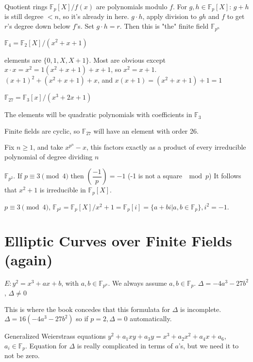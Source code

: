 \documentclass[10pt]{article}
\newcommand{\F}{\mathbb{F}}
\begin{document}
Quotient rings $\F_p[X]/f(x)$ are polynomials modulo $f$. For $g, h\in \F_p[X]$: $g + h$ is still degree $< n$, so it's already in here. $g\cdot h$, apply division to $gh$ and $f$ to get $r$'s degree down below $f$'s. Set $g\cdot h = r$. Then this is "the" finite field $\F_{p^n}$

\begin{exm*}
    $\F_4 = \F_2[X]/(x^2 + x + 1)$
\end{exm*}
elements are $\{0, 1, X, X+1\}$. Most are obvious except $x\cdot x = x^2 = 1(x^2 + x + 1) + x + 1$, so $x^2 = x + 1$. $(x + 1)^2 + (x^2 + x + 1) + x$, and $x(x+1) = (x^2 + x + 1) + 1 = 1$

\begin{exm*}
    $\F_{27} = \F_3[x]/(x^3 + 2x + 1)$
\end{exm*}
The elements will be quadratic polynomials with coefficients in $\F_3$

\begin{rmk}
    Finite fields are cyclic, so $\F_{27}$ will have an element with order 26.
\end{rmk}

\begin{rmk}
    Fix $n \geq 1$, and take $x^{p^n}-x$, this factors exactly as a product of every irreducible polynomial of degree dividing $n$
\end{rmk}

\begin{rmk}
    $\F_{p^2}$. If $p\equiv 3\pmod{4}$ then $\left(\dfrac{-1}{p}\right) = -1$ (-1 is not a square $\mod{p}$) It follows that $x^2 + 1$ is irreducible in $\F_p[X]$.
\end{rmk}
$p \equiv 3\pmod{4}$, $\F_{p^2} = \F_p[X]/x^2 + 1 = \F_p[i] = \{a + bi | a, b \in \F_p\}, i^2 = -1$.

\section{Elliptic Curves over Finite Fields (again)}
$E: y^2 = x^3 + ax + b$, with $a, b \in \F_{p^n}$. We always assume $a, b \in \F_p$. $\Delta = -4a^3-27b^2$, $\Delta \neq 0$

This is where the book concedes that this formulata for $\Delta$ is incomplete. $\Delta = 16(-4a^3 - 27b^2)$ so if $p = 2, \Delta = 0$ automatically.

Generalized Weierstrass equations $y^2 + a_1xy + a_3y = x^3 + a_2x^2 + a_4x + a_6$, $a_i \in \F_p$. Equation for $\Delta$ is really complicated in terms of $a$'s, but we need it to not be zero.
\end{document}
